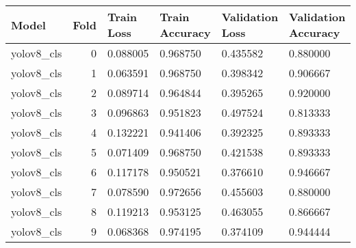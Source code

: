\begin{tabular}{|l|r|l|l|l|l|}
\toprule \hline
Model & Fold & Train Loss & Train Accuracy & Validation Loss & Validation Accuracy \\ \hline
\midrule
yolov8\_cls & 0 & 0.088005 & 0.968750 & 0.435582 & 0.880000 \\ \hline
yolov8\_cls & 1 & 0.063591 & 0.968750 & 0.398342 & 0.906667 \\ \hline
yolov8\_cls & 2 & 0.089714 & 0.964844 & 0.395265 & 0.920000 \\ \hline
yolov8\_cls & 3 & 0.096863 & 0.951823 & 0.497524 & 0.813333 \\ \hline
yolov8\_cls & 4 & 0.132221 & 0.941406 & 0.392325 & 0.893333 \\ \hline
yolov8\_cls & 5 & 0.071409 & 0.968750 & 0.421538 & 0.893333 \\ \hline
yolov8\_cls & 6 & 0.117178 & 0.950521 & 0.376610 & 0.946667 \\ \hline
yolov8\_cls & 7 & 0.078590 & 0.972656 & 0.455603 & 0.880000 \\ \hline
yolov8\_cls & 8 & 0.119213 & 0.953125 & 0.463055 & 0.866667 \\ \hline
yolov8\_cls & 9 & 0.068368 & 0.974195 & 0.374109 & 0.944444 \\ \hline
\bottomrule
\end{tabular}
